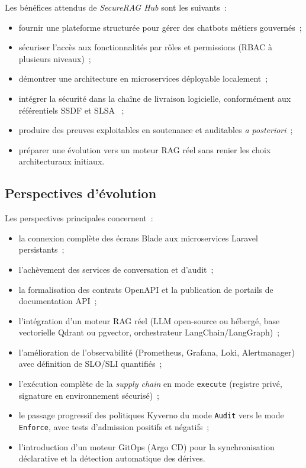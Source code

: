 Les bénéfices attendus de \textit{SecureRAG Hub} sont les suivants~:
\begin{itemize}
    \item fournir une plateforme structurée pour gérer des chatbots métiers gouvernés~;
    \item sécuriser l'accès aux fonctionnalités par rôles et permissions (RBAC à plusieurs niveaux)~;
    \item démontrer une architecture en microservices déployable localement~;
    \item intégrer la sécurité dans la chaîne de livraison logicielle, conformément aux référentiels SSDF \cite{nist_ssdf_800218} et SLSA \cite{slsa_spec_v1}~;
    \item produire des preuves exploitables en soutenance et auditables \textit{a posteriori}~;
    \item préparer une évolution vers un moteur RAG réel sans renier les choix architecturaux initiaux.
\end{itemize}

\subsection{Perspectives d'évolution}

Les perspectives principales concernent~:
\begin{itemize}
    \item la connexion complète des écrans Blade aux microservices Laravel persistants~;
    \item l'achèvement des services de conversation et d'audit~;
    \item la formalisation des contrats OpenAPI et la publication de portails de documentation API~;
    \item l'intégration d'un moteur RAG réel (LLM open-source ou hébergé, base vectorielle Qdrant ou pgvector, orchestrateur LangChain/LangGraph)~;
    \item l'amélioration de l'observabilité (Prometheus, Grafana, Loki, Alertmanager) avec définition de SLO/SLI quantifiés~;
    \item l'exécution complète de la \textit{supply chain} en mode \texttt{execute} (registre privé, signature en environnement sécurisé)~;
    \item le passage progressif des politiques Kyverno du mode \texttt{Audit} vers le mode \texttt{Enforce}, avec tests d'admission positifs et négatifs~;
    \item l'introduction d'un moteur GitOps (Argo CD) pour la synchronisation déclarative et la détection automatique des dérives.
\end{itemize}


